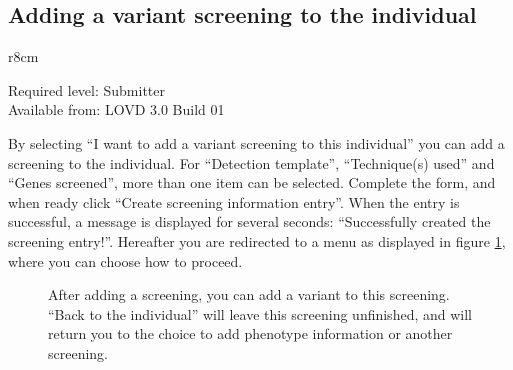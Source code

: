 \subsection{Adding a variant screening to the individual}
\label{ssec:add_variant_screening_to_an_individual}
\begin{wrapfigure}[3]{r}{8cm} %
  \vspace{-25pt}
  \begin{leftbar}
    Required level: Submitter\\
    Available from: LOVD 3.0 Build 01
  \end{leftbar}
\end{wrapfigure}
By selecting ``I want to add a variant screening to this individual'' you can add a screening to the individual.
For ``Detection template'', ``Technique(s) used'' and ``Genes screened'', more than one item can be selected.
Complete the form, and when ready click ``Create screening information entry''.
When the entry is successful, a message is displayed for several seconds:
 ``Successfully created the screening entry!''.
Hereafter you are redirected to a menu as displayed in figure \ref{fig:submission_of_screening},
 where you can choose how to proceed.

\begin{figure}[ht]
  \begin{shaded}
  \caption{%
    After adding a screening, you can add a variant to this screening.
    ``Back to the individual'' will leave this screening unfinished, and will return
     you to the choice to add phenotype information or another screening.}
  \label{fig:submission_of_screening}
  \end{shaded}
\end{figure}



